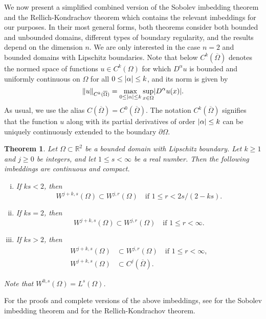\documentclass[english, 12pt, a4paper, sci, utf8, a-2b, online]{aaltothesis}
\theoremstyle{definition}
\theoremstyle{plain}
\newtheorem{theorem}{Theorem}[section]
\DeclarePairedDelimiter\abs{\lvert}{\rvert}
\DeclarePairedDelimiter\norm{\lVert}{\rVert}
\numberwithin{equation}{section}
\begin{document}
We now present a simplified combined version of the Sobolev imbedding
theorem and the Rellich-Kondrachov theorem which contains the relevant
imbeddings for our purposes. In their most general forms,
both theorems consider both bounded and unbounded domains,
different types of boundary regularity, and the results
depend on the dimension $n$. We are only interested in the
case $n=2$ and bounded domains with Lipschitz boundaries.
Note that below $C^k(\overline{\Omega})$ denotes the normed space of functions
$u \in C^k(\Omega)$ for which $D^{\alpha} u$ is bounded and uniformly
continuous on $\Omega$ for all $0 \leq \abs{\alpha} \leq k$,
and its norm is given by
\begin{equation*}
    \norm{u}_{C^k(\overline{\Omega})}
    = \max_{0 \leq \abs{\alpha} \leq k}
        \sup_{x \in \Omega} \abs{D^{\alpha} u(x)}.
\end{equation*}
As usual, we use the alias $C(\overline{\Omega}) = C^0(\overline{\Omega})$.
The notation $C^k(\overline{\Omega})$ signifies
that the function $u$ along with its partial derivatives of order
$\abs{\alpha} \leq k$ can be uniquely continuously extended to the boundary $\partial \Omega$.
\begin{theorem}
    \label{thm:sobolevimbedding}
    Let $\Omega \subset \mathbb{R}^2$ be a bounded domain with Lipschitz boundary.
    Let $k \geq 1$ and $j \geq 0$ be integers, and let $1 \leq s < \infty$ be a
    real number. Then the following imbeddings are continuous and compact.
    \begin{enumerate}[(i)]
        \item If $ks < 2$, then
        \begin{equation*}
            W^{j+k,s}(\Omega) \subset W^{j,r}(\Omega)
            \quad \text{if } 1 \leq r < 2s/(2-ks) .
        \end{equation*}
        \item If $ks = 2$, then
        \begin{equation*}
            W^{j+k,s}(\Omega) \subset W^{j,r}(\Omega)
            \quad \text{if } 1 \leq r < \infty.
        \end{equation*}
        \item If $ks > 2$, then
        \begin{align*}
            W^{j+k,s}(\Omega) &\subset W^{j,r}(\Omega)
            \quad \text{if } 1 \leq r < \infty, \\
            W^{j+k,s}(\Omega) &\subset C^j(\overline{\Omega}).
        \end{align*}
    \end{enumerate}
    Note that $W^{0,s}(\Omega) = L^s(\Omega)$.
\end{theorem}
For the proofs and complete versions of the above imbeddings, see
\cite[Theorem~4.12 on p.~85]{adams2003} for the Sobolev imbedding theorem
and \cite[Theorem~6.3 on p.~168]{adams2003} for the Rellich-Kondrachov theorem.
\end{document}
